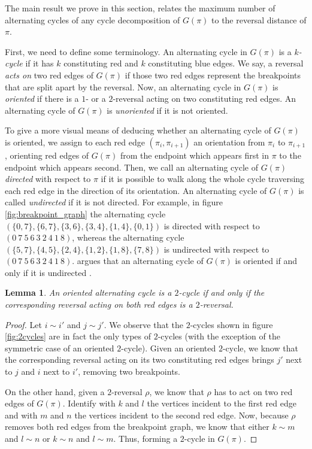 \documentclass[11pt,DIV=11]{scrartcl}
\def\padding{\vspace{2em}}
\newtheorem{lemma}[theorem]{Lemma}
\theoremstyle{definition}
\theoremstyle{remark}
\begin{document}
The main result we prove in this section, relates the maximum number of alternating cycles of any cycle decomposition of $G(\pi)$ to the reversal distance of $\pi$.\padding

First, we need to define some terminology. An alternating cycle in $G(\pi)$ is a \textit{$k$-cycle} if it has $k$ constituting red and $k$ constituting blue edges. We say, a reversal \textit{acts on} two red edges of $G(\pi)$ if those two red edges represent the breakpoints that are split apart by the reversal. Now, an alternating cycle in $G(\pi)$ is \textit{oriented} if there is a $1$- or a $2$-reversal acting on two constituting red edges. An alternating cycle of $G(\pi)$ is \textit{unoriented} if it is not oriented.

To give a more visual means of deducing whether an alternating cycle of $G(\pi)$ is oriented, we assign to each red edge $(\pi_i, \pi_{i+1})$ an orientation from $\pi_i$ to $\pi_{i+1}$, orienting red edges of $G(\pi)$ from the endpoint which appears first in $\pi$ to the endpoint which appears second. Then, we call an alternating cycle of $G(\pi)$ \textit{directed} with respect to $\pi$ if it is possible to walk along the whole cycle traversing each red edge in the direction of its orientation. An alternating cycle of $G(\pi)$ is called \textit{undirected} if it is not directed. For example, in figure \ref{fig:breakpoint_graph} the alternating cycle $(\{0,7\},\{6,7\},\{3,6\},\{3,4\},\{1,4\},\{0,1\})$ is directed with respect to $(0\ 7\ 5\ 6\ 3\ 2\ 4\ 1\ 8)$, whereas the alternating cycle $(\{5,7\},\{4,5\},\{2,4\},\{1,2\},\{1,8\},\{7,8\})$ is undirected with respect to $(0\ 7\ 5\ 6\ 3\ 2\ 4\ 1\ 8)$. \citeauthor*{Caprara1997} argues that an alternating cycle of $G(\pi)$ is oriented if and only if it is undirected \cite{Caprara1997}.

\begin{lemma}
\label{lem:1}
An oriented alternating cycle is a $2$-cycle if and only if the corresponding reversal acting on both red edges is a $2$-reversal.
\end{lemma}

\begin{proof}
Let $i \sim i'$ and $j \sim j'$. We observe that the $2$-cycles shown in figure \ref{fig:2cycles} are in fact the only types of $2$-cycles (with the exception of the symmetric case of an oriented $2$-cycle). Given an oriented $2$-cycle, we know that the corresponding reversal acting on its two constituting red edges brings $j'$ next to $j$ and $i$ next to $i'$, removing two breakpoints.

On the other hand, given a $2$-reversal $\rho$, we know that $\rho$ has to act on two red edges of $G(\pi)$. Identify with $k$ and $l$ the vertices incident to the first red edge and with $m$ and $n$ the vertices incident to the second red edge. Now, because $\rho$ removes both red edges from the breakpoint graph, we know that either $k \sim m$ and $l \sim n$ or $k \sim n$ and $l \sim m$. Thus, forming a $2$-cycle in $G(\pi)$.
\end{proof}
\end{document}
